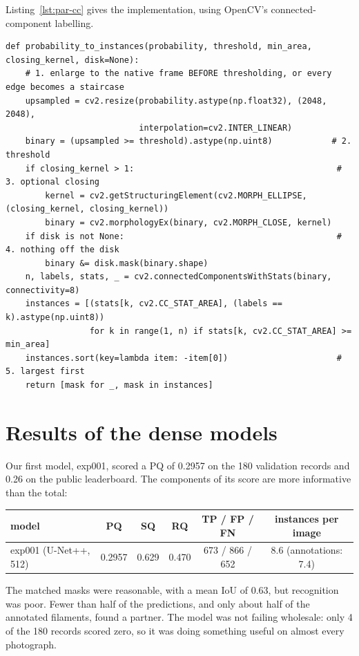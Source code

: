 Listing~\ref{lst:par-cc} gives the implementation, using OpenCV's connected-component labelling.

\begin{lstlisting}[caption={Semantic probabilities to disjoint instances. Condensed from
\file{experiments/exp\_001\_baseline/src/postprocess.py}.},label=lst:par-cc]
def probability_to_instances(probability, threshold, min_area, closing_kernel, disk=None):
    # 1. enlarge to the native frame BEFORE thresholding, or every edge becomes a staircase
    upsampled = cv2.resize(probability.astype(np.float32), (2048, 2048),
                           interpolation=cv2.INTER_LINEAR)
    binary = (upsampled >= threshold).astype(np.uint8)            # 2. threshold
    if closing_kernel > 1:                                         # 3. optional closing
        kernel = cv2.getStructuringElement(cv2.MORPH_ELLIPSE, (closing_kernel, closing_kernel))
        binary = cv2.morphologyEx(binary, cv2.MORPH_CLOSE, kernel)
    if disk is not None:                                           # 4. nothing off the disk
        binary &= disk.mask(binary.shape)
    n, labels, stats, _ = cv2.connectedComponentsWithStats(binary, connectivity=8)
    instances = [(stats[k, cv2.CC_STAT_AREA], (labels == k).astype(np.uint8))
                 for k in range(1, n) if stats[k, cv2.CC_STAT_AREA] >= min_area]
    instances.sort(key=lambda item: -item[0])                      # 5. largest first
    return [mask for _, mask in instances]
\end{lstlisting}

\section{Results of the dense models}\label{sec:paradigms-results}
Our first model, exp001, scored a PQ of 0.2957 on the 180 validation records and 0.26 on the public
leaderboard. The components of its score are more informative than the total:
\begin{center}\small
\setlength{\tabcolsep}{4pt}
\begin{tabular}{@{}lccccc@{}}
\toprule
model & PQ & SQ & RQ & TP / FP / FN & instances per image \\
\midrule
exp001 (U-Net++, 512) & 0.2957 & 0.629 & 0.470 & 673 / 866 / 652 & 8.6 (annotations: 7.4) \\
\bottomrule
\end{tabular}
\end{center}
The matched masks were reasonable, with a mean IoU of 0.63, but recognition was poor. Fewer than
half of the predictions, and only about half of the annotated filaments, found a partner. The model
was not failing wholesale: only 4 of the 180 records scored zero, so it was doing something useful
on almost every photograph.

